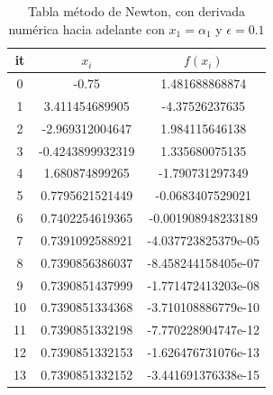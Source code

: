 \documentclass{article} %
\begin{document}
\begin{table}[H]
\centering
\begin{tabular}{|c|c|c|}
\hline
it & $x_i$ & $f(x_i)$\\
\hline
0 & -0.75 & 1.481688868874\\
1 & 3.411454689905 & -4.37526237635\\
2 & -2.969312004647 & 1.984115646138\\
3 & -0.4243899932319 & 1.335680075135\\
4 & 1.680874899265 & -1.790731297349\\
5 & 0.7795621521449 & -0.0683407529021\\
6 & 0.7402254619365 & -0.001908948233189\\
7 & 0.7391092588921 & -4.037723825379e-05\\
8 & 0.7390856386037 & -8.458244158405e-07\\
9 & 0.7390851437999 & -1.771472413203e-08\\
10 & 0.7390851334368 & -3.710108886779e-10\\
11 & 0.7390851332198 & -7.770228904747e-12\\
12 & 0.7390851332153 & -1.626476731076e-13\\
13 & 0.7390851332152 & -3.441691376338e-15\\
\hline
\end{tabular}
\caption{Tabla método de Newton, con derivada numérica hacia adelante con $x_1 = \alpha_1$ y $\epsilon = 0.1$}
\end{table}
\end{document}
